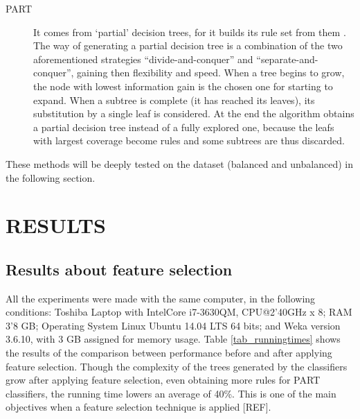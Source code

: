 \documentclass{llncs}
\begin{document}
\begin{description}
   \item[PART] It comes from `partial' decision trees, for it builds its rule set from them \cite{Frank1998}. The way of generating a partial decision tree is a combination of the two aforementioned strategies ``divide-and-conquer'' and ``separate-and-conquer'', gaining then flexibility and speed. When a tree begins to grow, the node with lowest information gain is the chosen one for starting to expand. When a subtree is complete (it has reached its leaves), its substitution by a single leaf is considered. At the end the algorithm obtains a partial decision tree instead of a fully explored one, because the leafs with largest coverage become rules and some subtrees are thus discarded.
 \end{description} 

These methods will be deeply tested on the dataset (balanced and unbalanced) in the following section.


%
\section{\uppercase{Results}}
\label{sec:results}

\subsection{Results about feature selection}
\label{subsec:RSTresults}

All the experiments were made with the same computer, in the following conditions: Toshiba Laptop with Intel\texttrademark  Core i7-3630QM, CPU@2'40GHz x 8; RAM 3'8 GB; Operating System Linux Ubuntu 14.04 LTS 64 bits; and Weka version 3.6.10, with 3 GB assigned for memory usage. Table \ref{tab_runningtimes} shows the results of the comparison between performance before and after applying feature selection. Though the complexity of the trees generated by the classifiers grow after applying feature selection, even obtaining more rules for PART classifiers, the running time lowers an average of 40\%. This is one of the main objectives when a feature selection technique is applied [REF].
\end{document}
